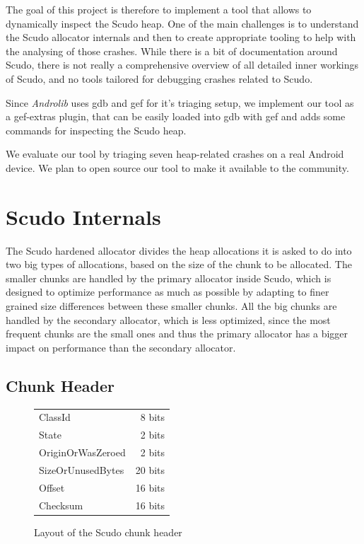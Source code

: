 \documentclass[a4paper,11pt,oneside]{report}
\begin{document}
The goal of this project is therefore to implement a tool that allows to dynamically 
inspect the Scudo heap. 
One of the main challenges is 
to understand the Scudo allocator internals and then to
create appropriate tooling to help with the analysing of those crashes.
While there is a bit of documentation around Scudo, there is not really a
comprehensive overview of all detailed inner workings of Scudo, and no 
tools tailored for debugging crashes related to Scudo.

Since \textit{Androlib} uses gdb and gef for it's triaging setup, we implement our tool as a gef-extras plugin, 
that can be easily loaded into gdb with gef and adds some commands for inspecting the
Scudo heap.
 
We evaluate our tool by triaging seven heap-related crashes on a real Android 
device.
We plan to open source our tool to make it available to the community.

\chapter{Scudo Internals}

The Scudo hardened allocator divides the heap allocations it is asked to do into
two big types of allocations, based on the size of the chunk to be allocated.
The smaller chunks are handled by the primary allocator inside Scudo, which is
designed to optimize performance as much as possible by adapting to finer grained
size differences between these smaller chunks. All the big chunks are handled by
the secondary allocator, which is less optimized, since the most frequent chunks
are the small ones and thus the primary allocator has a bigger impact on performance
than the secondary allocator.

\section{Chunk Header}

\begin{figure}[h]
  \centering
  \begin{tabular}{lr}
    ClassId           & 8 bits  \\
    State             & 2 bits  \\
    OriginOrWasZeroed & 2 bits  \\
    SizeOrUnusedBytes & 20 bits \\
    Offset            & 16 bits \\
    Checksum          & 16 bits
  \end{tabular}
  \caption{Layout of the Scudo chunk header}
  \label{fig:ScudoChunkHeader}
\end{figure}
\end{document}
